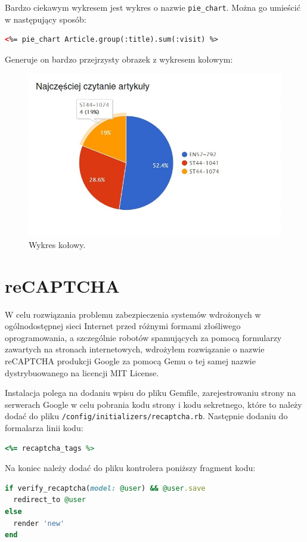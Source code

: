 \documentclass[openright]{xmgr}
\begin{document}
Bardzo ciekawym wykresem jest wykres o nazwie \texttt{pie\_chart}. Można go umieścić w następujący sposób:
\begin{lstlisting}[language=html, caption={Kod uruchamiający wykres kołowy}]
<%= pie_chart Article.group(:title).sum(:visit) %>
\end{lstlisting}
Generuje on bardzo przejrzysty obrazek z wykresem kołowym:
\begin{figure}[!tbh]
\centering
\includegraphics[width=.5\linewidth]{fig/chartkick}
\caption{Wykres kołowy.}
\end{figure}

\section{reCAPTCHA}

W celu rozwiązania problemu zabezpieczenia systemów wdrożonych w ogólnodostępnej sieci Internet przed różnymi formami złośliwego oprogramowania, a szczególnie robotów spamujących za pomocą formularzy zawartych na stronach internetowych, wdrożyłem rozwiązanie o nazwie reCAPTCHA produkcji Google za pomocą Gemu o tej samej nazwie \cite{recaptcha} dystrybuowanego na licencji MIT License. 

\newpage

Instalacja polega na dodaniu wpisu do pliku Gemfile, zarejestrowaniu strony na serwerach Google w celu pobrania kodu strony i kodu sekretnego, które to należy dodać do pliku \texttt{/config/initializers/recaptcha.rb}. Następnie dodaniu do formalarza linii kodu:
\begin{lstlisting}[language=ruby, caption={Kod wyświetlający formularz reCAPTCHA}]
<%= recaptcha_tags %> 
\end{lstlisting}
Na koniec należy dodać do pliku kontrolera poniższy fragment kodu: 
\begin{lstlisting}[language=ruby, caption={Kod kontrolera weryfikujący reCAPTCHA}]
if verify_recaptcha(model: @user) && @user.save
  redirect_to @user
else
  render 'new'
end
\end{lstlisting}
\end{document}

